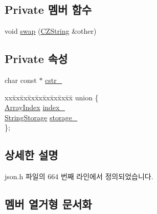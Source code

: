 \subsection*{Private 멤버 함수}
\begin{DoxyCompactItemize}
\item 
void \hyperlink{class_json_1_1_value_1_1_c_z_string_ad59f3542d2eea749a6a63409d1a02207}{swap} (\hyperlink{class_json_1_1_value_1_1_c_z_string}{C\+Z\+String} \&other)
\end{DoxyCompactItemize}
\subsection*{Private 속성}
\begin{DoxyCompactItemize}
\item 
char const  $\ast$ \hyperlink{class_json_1_1_value_1_1_c_z_string_a5b4d28349294034d7f779c3c95d0306c}{cstr\+\_\+}
\item 
\begin{tabbing}
xx\=xx\=xx\=xx\=xx\=xx\=xx\=xx\=xx\=\kill
union \{\\
\>\hyperlink{class_json_1_1_value_a184a91566cccca7b819240f0d5561c7d}{ArrayIndex} \hyperlink{class_json_1_1_value_1_1_c_z_string_aecf29982235c9c165a0971023ebbb270}{index\_}\\
\>\hyperlink{struct_json_1_1_value_1_1_c_z_string_1_1_string_storage}{StringStorage} \hyperlink{class_json_1_1_value_1_1_c_z_string_a17c92f0f089a4314e3b1d5695dc1a851}{storage\_}\\
\}; \\

\end{tabbing}\end{DoxyCompactItemize}


\subsection{상세한 설명}


json.\+h 파일의 664 번째 라인에서 정의되었습니다.



\subsection{멤버 열거형 문서화}
\mbox{\label{class_json_1_1_value_1_1_c_z_string_a2805c46fb4a72bbaed55de6d75941b6d}} 
